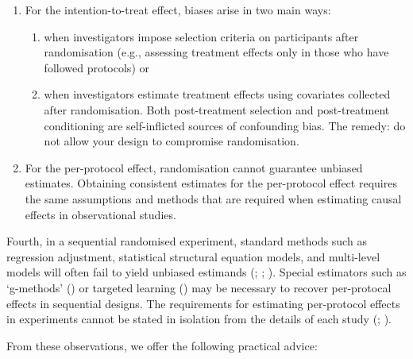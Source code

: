 \documentclass[
  single column]{article}
\providecommand{\tightlist}{%
  \setlength{\itemsep}{0pt}\setlength{\parskip}{0pt}}\usepackage{longtable,booktabs,array}
\begin{document}
\begin{enumerate}
\def\labelenumi{\roman{enumi}.}
\tightlist
\item
  For the intention-to-treat effect, biases arise in two main ways:

  \begin{enumerate}
  \def\labelenumii{\alph{enumii}.}
  \tightlist
  \item
    when investigators impose selection criteria on participants after
    randomisation (e.g., assessing treatment effects only in those who
    have followed protocols) or
  \item
    when investigators estimate treatment effects using covariates
    collected after randomisation. Both post-treatment selection and
    post-treatment conditioning are self-inflicted sources of
    confounding bias. The remedy: do not allow your design to compromise
    randomisation.
  \end{enumerate}
\item
  For the per-protocol effect, randomisation cannot guarantee unbiased
  estimates. Obtaining consistent estimates for the per-protocol effect
  requires the same assumptions and methods that are required when
  estimating causal effects in observational studies.
\end{enumerate}

Fourth, in a sequential randomised experiment, standard methods such as
regression adjustment, statistical structural equation models, and
multi-level models will often fail to yield unbiased estimands
(;
;
).
Special estimators such as `g-methods'
() or targeted
learning () may
be necessary to recover per-protocal effects in sequential designs. The
requirements for estimating per-protocol effects in experiments cannot
be stated in isolation from the details of each study
(;
).

From these observations, we offer the following practical advice:
\end{document}
